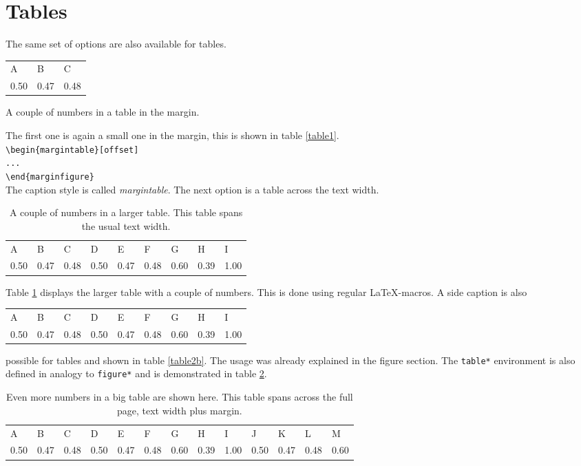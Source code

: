 \documentclass{caesar_book}
\begin{document}
\section{Tables}
The same set of options are also available for tables.%
%
\begin{margintable}%
	\begin{tabular}{lll}%
     A&B&C\\%
     0.50&0.47&0.48\\%
    \end{tabular}%
	\vspace{2pt}
	\caption{A couple of numbers in a table in the margin.\label{table1}}%
\end{margintable}%
The first one is again a small one in the margin, this is shown in table \ref{table1}.\\
\verb+\begin{margintable}[offset]+\\
\verb+...+\\
\verb+\end{marginfigure}+\\
The caption style is called \textit{margintable}. The next option is a table across the text width. %
%
\begin{table}[htbp]%
	 \begin{tabular}{lllllllll}%
     A&B&C&D&E&F&G&H&I\\%
    0.50&0.47&0.48&0.50&0.47&0.48&0.60&0.39&1.00\\%
    \end{tabular}%
	\vspace{2pt}%
	\captionsetup{width=\textwidth, justification=justified}%
	\caption{A couple of numbers in a larger table. This table spans the usual text width.\label{table2}}%
\end{table}%
%
Table \ref{table2} displays the larger table with a couple of numbers. This is done using regular \LaTeX-macros. A side caption is also %
%
\begin{table}[htbp]%
	 \begin{tabular}{lllllllll}%
     A&B&C&D&E&F&G&H&I\\%
    0.50&0.47&0.48&0.50&0.47&0.48&0.60&0.39&1.00\\%
    \end{tabular}%
\end{table}%
%
possible for tables and shown in table \ref{table2b}. The usage was already explained in the figure section. The \texttt{table*} environment is also defined in analogy to \texttt{figure*} and is demonstrated in table \ref{table3}.
%
\begin{table}[htbp]
 \begin{tabular}{lllllllllllll}%
     A&B&C&D&E&F&G&H&I&J&K&L&M\\%
    0.50&0.47&0.48&0.50&0.47&0.48&0.60&0.39&1.00&0.50&0.47&0.48&0.60\\%
  \end{tabular}%
  \vspace{2pt}
  \caption{Even more numbers in a big table are shown here. This table spans across the full page, text width plus margin.\label{table3}}%
\end{table}
%
\end{document}
